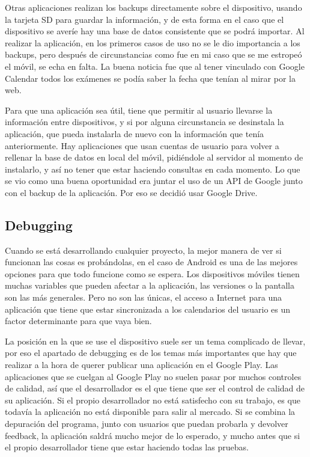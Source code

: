 Otras aplicaciones realizan los backups directamente sobre el dispositivo, usando la tarjeta SD para guardar la información, y de esta forma en el caso que el dispositivo se averíe hay una base de datos consistente que se podrá importar.
Al realizar la aplicación, en los primeros casos de uso no se le dio importancia a los backups, pero después de circunstancias como fue en mi caso que se me estropeó el móvil, se echa en falta. La buena noticia fue que al tener vinculado con Google Calendar todos los exámenes se podía saber la fecha que tenían al mirar por la web.

Para que una aplicación sea útil, tiene que permitir al usuario llevarse la información entre dispositivos, y si por alguna circunstancia se desinstala la aplicación, que pueda instalarla de nuevo con la información que tenía anteriormente.
Hay aplicaciones que usan cuentas de usuario para volver a rellenar la base de datos en local del móvil, pidiéndole al servidor al momento de instalarlo, y así no tener que estar haciendo consultas en cada momento.
Lo que se vio como una buena oportunidad era juntar el uso de un API de Google junto con el backup de la aplicación. Por eso se decidió usar Google Drive.

\subsection{Debugging}
\label{subsecc:Debugging}

Cuando se está desarrollando cualquier proyecto, la mejor manera de ver si funcionan las cosas es probándolas, en el caso de Android es una de las mejores opciones para que todo funcione como se espera.
Los dispositivos móviles tienen muchas variables que pueden afectar a la aplicación, las versiones o la pantalla son las más generales. Pero no son las únicas, el acceso a Internet para una aplicación que tiene que estar sincronizada a los calendarios del usuario es un factor determinante para que vaya bien.

La posición en la que se use el dispositivo suele ser un tema complicado de llevar, por eso el apartado de debugging es de los temas más importantes que hay que realizar a la hora de querer publicar una aplicación en el Google Play.
Las aplicaciones que se cuelgan al Google Play no suelen pasar por muchos controles de calidad, así que el desarrollador es el que tiene que ser el control de calidad de su aplicación. Si el propio desarrollador no está satisfecho con su trabajo, es que todavía la aplicación no está disponible para salir al mercado.
Si se combina la depuración del programa, junto con usuarios que puedan probarla y devolver feedback, la aplicación saldrá mucho mejor de lo esperado, y mucho antes que si el propio desarrollador tiene que estar haciendo todas las pruebas.

